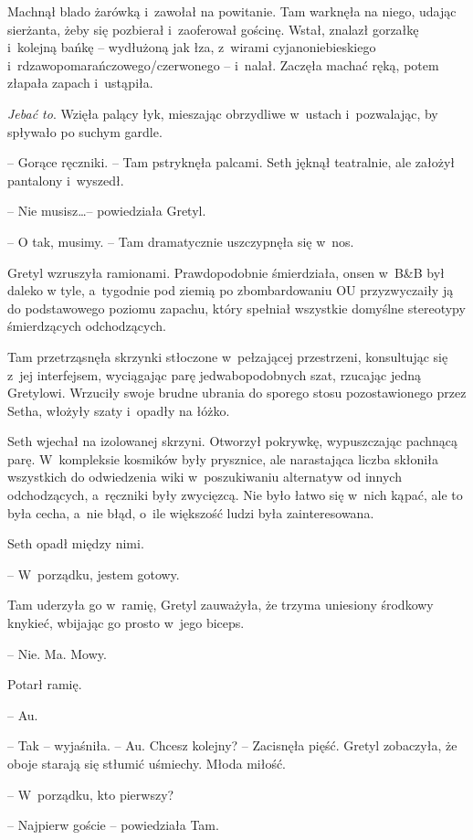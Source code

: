 \documentclass[oneside,polish,11pt,sfheadings]{mwbk}
\begin{document}
Machnął blado żarówką i~zawołał na powitanie. Tam warknęła na niego,
udając sierżanta, żeby się pozbierał i~zaoferował gościnę. Wstał,
znalazł gorzałkę i~kolejną bańkę -- wydłużoną jak łza, z~wirami
cyjanoniebieskiego i~rdzawopomarańczowego/czerwonego -- i~nalał. Zaczęła
machać ręką, potem złapała zapach i~ustąpiła.

\textit{Jebać to}. Wzięła palący łyk, mieszając obrzydliwe w~ustach i~pozwalając, by spływało po suchym gardle.

-- Gorące ręczniki. -- Tam pstryknęła palcami. Seth jęknął teatralnie, ale
założył pantalony i~wyszedł.

-- Nie musisz\ldots  -- powiedziała Gretyl.

-- O tak, musimy. -- Tam dramatycznie uszczypnęła się w~nos. 

Gretyl wzruszyła ramionami. Prawdopodobnie śmierdziała, onsen w~B\&B był daleko
w tyle, a~tygodnie pod ziemią po zbombardowaniu OU przyzwyczaiły ją do
podstawowego poziomu zapachu, który spełniał wszystkie domyślne
stereotypy śmierdzących odchodzących.

Tam przetrząsnęła skrzynki stłoczone w~pełzającej przestrzeni,
konsultując się z~jej interfejsem, wyciągając parę jedwabopodobnych
szat, rzucając jedną Gretylowi. Wrzuciły swoje brudne ubrania do sporego
stosu pozostawionego przez Setha, włożyły szaty i~opadły na łóżko.

Seth wjechał na izolowanej skrzyni. Otworzył pokrywkę, wypuszczając
pachnącą parę. W~kompleksie kosmików były prysznice, ale narastająca
liczba skłoniła wszystkich do odwiedzenia wiki w~poszukiwaniu alternatyw
od innych odchodzących, a~ręczniki były zwycięzcą. Nie było łatwo się w~nich kąpać, ale to była cecha, a~nie błąd, o~ile większość ludzi była
zainteresowana.

Seth opadł między nimi. 

-- W~porządku, jestem gotowy.

Tam uderzyła go w~ramię, Gretyl zauważyła, że trzyma uniesiony środkowy
knykieć, wbijając go prosto w~jego biceps. 

-- Nie. Ma. Mowy.

Potarł ramię. 

-- Au.

-- Tak -- wyjaśniła. -- Au. Chcesz kolejny? -- Zacisnęła pięść. Gretyl
zobaczyła, że oboje starają się stłumić uśmiechy. Młoda miłość.

-- W~porządku, kto pierwszy?

-- Najpierw goście -- powiedziała Tam.
\end{document}
